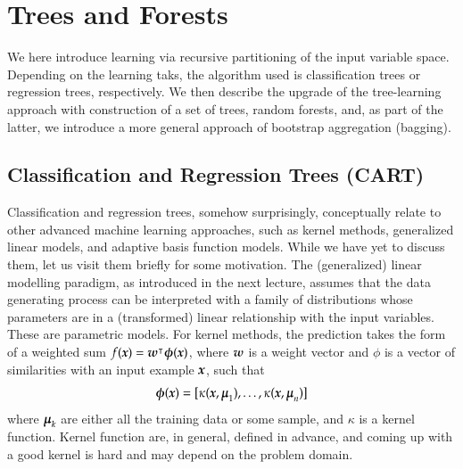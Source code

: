 \chapter{Trees and Forests}

\begin{summary}
We here introduce learning via recursive partitioning of the input variable space. Depending on the learning taks, the algorithm used is classification trees or regression trees, respectively. We then describe the upgrade of the tree-learning approach with construction of a set of trees, random forests, and, as part of the latter, we introduce a more general approach of bootstrap aggregation (bagging).
\end{summary}

\section{Classification and Regression Trees (CART)}

Classification and regression trees, somehow surprisingly, conceptually relate to other advanced machine learning approaches, such as kernel methods, generalized linear models, and adaptive basis function models. While we have yet to discuss them, let us visit them briefly for some motivation. The (generalized) linear modelling paradigm, as introduced in the next lecture, assumes that the data generating process can be interpreted with a family of distributions whose parameters are in a (transformed) linear relationship with the input variables. These are parametric models. For kernel methods, the prediction takes the form of a weighted sum $f(\boldsymbol{x})=\boldsymbol{w}^\intercal\boldsymbol{\phi}(\boldsymbol{x})$, where $\boldsymbol{w}$ is a weight vector and $\phi$ is a vector of similarities with an input example $\boldsymbol{x}$, such that
$$ \boldsymbol{\phi}(\boldsymbol{x}) = [\kappa(\boldsymbol{x},\boldsymbol{\mu}_1), \ldots, \kappa(\boldsymbol{x},\boldsymbol{\mu}_n)] $$
where $\boldsymbol{\mu}_k$ are either all the training data or some sample, and $\kappa$ is a kernel function. Kernel function are, in general, defined in advance, and coming up with a good kernel is hard and may depend on the problem domain.

